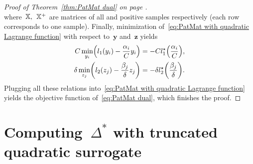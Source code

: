 \begin{proof}[Proof of Theorem~\ref{thm:PatMat dual} on page \pageref{thm:PatMat dual}]
\begin{equation*}
  \end{equation*}
  where~$\mathbb{X},$~$\mathbb{X}^+$ are matrices of all and positive samples respectively (each row corresponds to one sample). Finally, minimization of~\eqref{eq:PatMat with quadratic Lagrange function} with respect to~$\bm{y}$ and~$\bm{z}$ yields
  \begin{alignat*}{2}
      C \min_{y_i} \Brac{l_1(y_i) - \frac{\alpha_i}{C} y_i}
      & = - C l_1^{\star} \Brac{\frac{\alpha_i}{C}}, \\
      \delta \min_{z_j} \Brac{l_2(z_j) - \frac{\beta_j}{\delta} z_j}
      & = - \delta l_2^{\star} \Brac{\frac{\beta_j}{\delta}}.
  \end{alignat*}
  Plugging all these relations into~\eqref{eq:PatMat with quadratic Lagrange function} yields the objective function of~\eqref{eq:PatMat dual}, which finishes the proof.
\end{proof}

\section{Computing~$\Delta^{*}$ with truncated quadratic surrogate}\label{sec:Computing Delta with truncated quadratic surrogate}

\subsection{\TopPushK}

